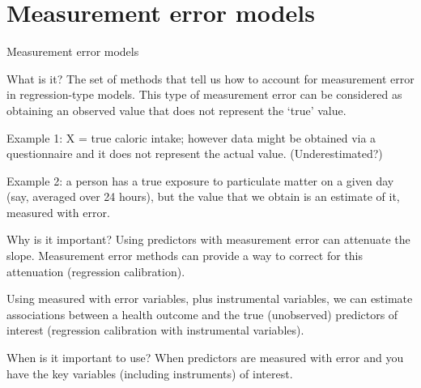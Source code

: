 \documentclass[
  9pt,
  ignorenonframetext,
]{beamer}
\begin{document}
\hypertarget{measurement-error-models}{%
\section{Measurement error models}\label{measurement-error-models}}

\begin{frame}{Measurement error models}
\protect\hypertarget{measurement-error-models-1}{}
\begin{block}{What is it?}
\protect\hypertarget{what-is-it-1}{}
The set of methods that tell us how to account for measurement error in
regression-type models. This type of measurement error can be considered
as obtaining an observed value that does not represent the `true' value.
\end{block}

\begin{block}{Example 1:}
\protect\hypertarget{example-1}{}
X = true caloric intake; however data might be obtained via a
questionnaire and it does not represent the actual value.
(Underestimated?)
\end{block}

\begin{block}{Example 2:}
\protect\hypertarget{example-2}{}
a person has a true exposure to particulate matter on a given day (say,
averaged over 24 hours), but the value that we obtain is an estimate of
it, measured with error.
\end{block}
\end{frame}

\begin{frame}{}
\protect\hypertarget{section-5}{}
\begin{block}{Why is it important?}
\protect\hypertarget{why-is-it-important-1}{}
Using predictors with measurement error can attenuate the slope.
Measurement error methods can provide a way to correct for this
attenuation (regression calibration).

Using measured with error variables, plus instrumental variables, we can
estimate associations between a health outcome and the true (unobserved)
predictors of interest (regression calibration with instrumental
variables).
\end{block}

\begin{block}{When is it important to use?}
\protect\hypertarget{when-is-it-important-to-use-1}{}
When predictors are measured with error and you have the key variables
(including instruments) of interest.
\end{block}
\end{frame}
\end{document}
